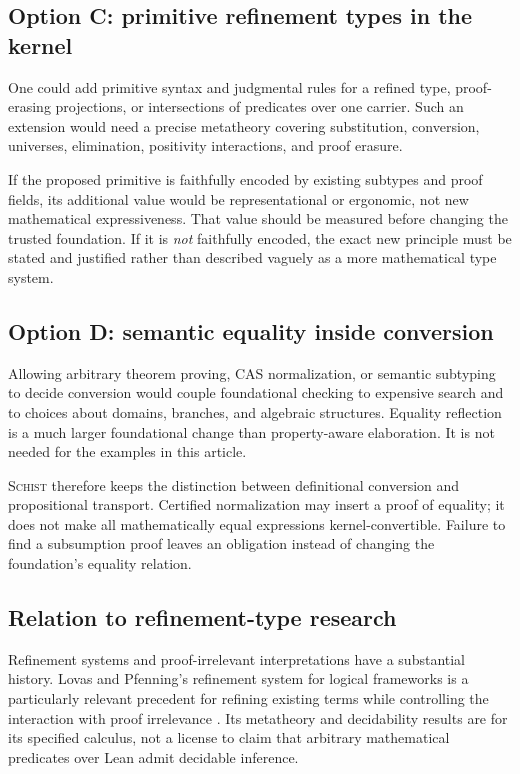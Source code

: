 \documentclass[11pt,a4paper]{article}
\newcommand{\Schist}{\textsc{Schist}}
\theoremstyle{definition}
\begin{document}
\subsection{Option C: primitive refinement types in the kernel}
One could add primitive syntax and judgmental rules for a refined type,
proof-erasing projections, or intersections of predicates over one carrier.
Such an extension would need a precise metatheory covering substitution,
conversion, universes, elimination, positivity interactions, and proof erasure.

If the proposed primitive is faithfully encoded by existing subtypes and proof
fields, its additional value would be representational or ergonomic, not new
mathematical expressiveness. That value should be measured before changing the
trusted foundation. If it is \emph{not} faithfully encoded, the exact new
principle must be stated and justified rather than described vaguely as a more
mathematical type system.

\subsection{Option D: semantic equality inside conversion}
Allowing arbitrary theorem proving, CAS normalization, or semantic subtyping
to decide conversion would couple foundational checking to expensive search
and to choices about domains, branches, and algebraic structures. Equality
reflection is a much larger foundational change than property-aware
elaboration. It is not needed for the examples in this article.

\Schist{} therefore keeps the distinction between definitional conversion and
propositional transport. Certified normalization may insert a proof of equality;
it does not make all mathematically equal expressions kernel-convertible.
Failure to find a subsumption proof leaves an obligation instead of changing
the foundation's equality relation.

\subsection{Relation to refinement-type research}
Refinement systems and proof-irrelevant interpretations have a substantial
history. Lovas and Pfenning's refinement system for logical frameworks is a
particularly relevant precedent for refining existing terms while controlling
the interaction with proof irrelevance \cite{lovaspfenning}. Its metatheory and
decidability results are for its specified calculus, not a license to claim
that arbitrary mathematical predicates over Lean admit decidable inference.
\end{document}

